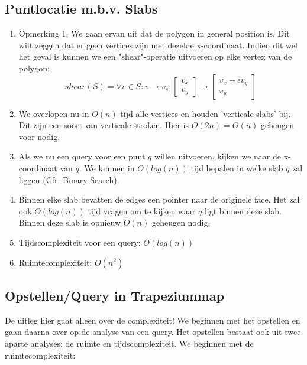 \documentclass[12pt,a4paper]{article}
\begin{document}
		\subsection{Puntlocatie m.b.v. Slabs}
			\begin{enumerate}
				\item Opmerking 1. We gaan ervan uit dat de polygon in general position is. Dit wilt zeggen dat er geen vertices zijn met dezelde x-coordinaat. Indien dit wel het geval is kunnen we een "shear"-operatie uitvoeren op elke vertex van de polygon:
				$$shear(S) = \forall v \in S: v \rightarrow v_s : \begin{bmatrix}
					v_x\\
					v_y
				\end{bmatrix} \mapsto 
				\begin{bmatrix}
					v_x + \epsilon v_y\\
					v_y
				\end{bmatrix}$$
				\item We overlopen nu in $O(n)$ tijd alle vertices en houden 'verticale slabs' bij. Dit zijn een soort van verticale stroken. Hier is $O(2n) = O(n)$ geheugen voor nodig. 
				\item Als we nu een query voor een punt $q$ willen uitvoeren, kijken we naar de x-coordinaat van $q$. We kunnen in $O(log (n))$ tijd bepalen in welke slab $q$ zal liggen (Cfr. Binary Search).
				\item Binnen elke slab bevatten de edges een pointer naar de originele face. Het zal ook $O(log (n))$ tijd vragen om te kijken waar $q$ ligt binnen deze slab. Binnen deze slab is opnieuw $O(n)$ geheugen nodig.
				\item Tijdscomplexiteit voor een query: $O(log (n))$
				\item Ruimtecomplexiteit: $O(n^2)$	
			\end{enumerate}
		
		\subsection{Opstellen/Query in Trapeziummap}
			De uitleg hier gaat alleen over de complexiteit! We beginnen met het opstellen en gaan daarna over op de analyse van een query. Het opstellen bestaat ook uit twee aparte analyses: de ruimte en tijdscomplexiteit. We beginnen met de ruimtecomplexiteit:
			
\end{document}
